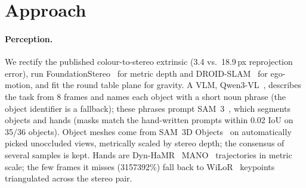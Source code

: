 \documentclass[10pt]{nvidiaextabstract}
\begin{document}
\section{Approach}
\label{sec:approach}

\paragraph{Perception.} We rectify the published colour-to-stereo extrinsic (3.4 vs.\ 18.9\,px reprojection error), run
FoundationStereo~\citep{wen2025foundationstereo} for metric depth and DROID-SLAM~\citep{teed2021droid} for ego-motion, and
fit the round table plane for gravity. A VLM, Qwen3-VL~\citep{bai2025qwen3vl}, describes the task from 8 frames and names each object with a short noun phrase (the
object identifier is a fallback); these phrases prompt SAM~3~\citep{carion2025sam3}, which segments objects and hands (masks
match the hand-written prompts within 0.02 IoU on 35/36 objects). Object meshes come from
SAM~3D Objects~\citep{chen2025sam3d} on automatically picked unoccluded views, metrically scaled by stereo depth; the
consensus of several samples is kept. Hands are Dyn-HaMR~\citep{yu2025dynhamr} MANO~\citep{romero2017mano} trajectories in metric scale;
the few frames it misses (3157392\%) fall back to WiLoR~\citep{potamias2025wilor} keypoints triangulated across the stereo pair.
\end{document}
